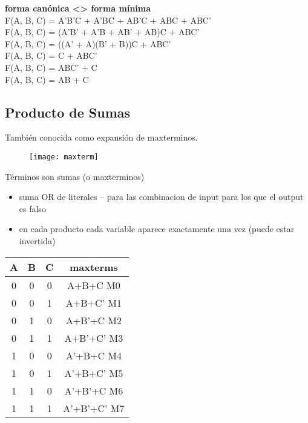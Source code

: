 \documentclass{article}
\begin{document}
                \newline
                \textbf{forma canónica <> forma mínima}\\
                \newline
                F(A, B, C) = A’B’C + A’BC + AB’C + ABC + ABC’\\
                F(A, B, C) = (A’B’ + A’B + AB’ + AB)C + ABC’\\
                F(A, B, C) = ((A’ + A)(B’ + B))C + ABC’\\
                F(A, B, C) = C + ABC’\\
                F(A, B, C) = ABC’ + C\\
                F(A, B, C) = AB + C
                \newpage
            \subsection{Producto de Sumas}
                También conocida como expansión de maxterminos.\\
                \begin{figure}[htp]
                \centering
                \texttt{[image: maxterm]}
                \end{figure}
                \newline
                Términos son sumas (o maxterminos)
                \begin{itemize}
                \item suma OR de literales – para las combinacion de input para los que el output es falso
                \item en cada producto cada variable aparece exactamente una vez (puede estar invertida)
                \end{itemize}
                \begin{center}
                \renewcommand{\arraystretch}{1.5}
                \begin{tabular}{ c c c|c } 
                 A & B & C & maxterms \\ 
                 \hline
                 0 & 0 & 0 & A+B+C M0\\ 
                 0 & 0 & 1 & A+B+C’ M1\\ 
                 0 & 1 & 0 & A+B’+C M2\\ 
                 0 & 1 & 1 & A+B’+C’ M3\\ 
                 1 & 0 & 0 & A’+B+C M4\\ 
                 1 & 0 & 1 & A’+B+C’ M5\\ 
                 1 & 1 & 0 & A’+B’+C M6\\ 
                 1 & 1 & 1 & A’+B’+C’ M7\\ 
                 \end{tabular}
                \end{center}
\end{document}
